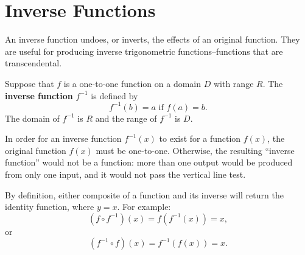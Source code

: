 \section{Inverse Functions}\label{sec:inverse}
An inverse function undoes, or inverts, the effects of an original function.
They are useful for producing inverse trigonometric functions--functions that are transcendental.

\begin{defn}
  Suppose that \(f\) is a one-to-one function on a domain $D$ with range $R$. The \textbf{inverse function} $f^{-1}$ is defined by
  \[ f^{-1}(b)=a \text{ if } f(a)=b. \]
  The domain of $f^{-1}$ is $R$ and the range of $f^{-1}$ is $D$.
\end{defn}
In order for an inverse function $f^{-1}(x)$ to exist for a function $f(x)$, the original function $f(x)$ must be one-to-one. Otherwise, the resulting ``inverse function'' would not be a function: more than one output would be produced from only one input, and it would not pass the vertical line test.
\begin{figure}[H]
  \begin{center}
  \end{center}
  \label{fig:inversef}
\end{figure}
\begin{remark} 
  By definition, either composite of a function and its inverse will return the identity function, where $y=x$. For example:
  \[ (f \circ f^{-1})(x)=f(f^{-1}(x))=x, \]
  or
  \[ (f^{-1} \circ f)(x)=f^{-1}(f(x))=x. \]
\end{remark}

